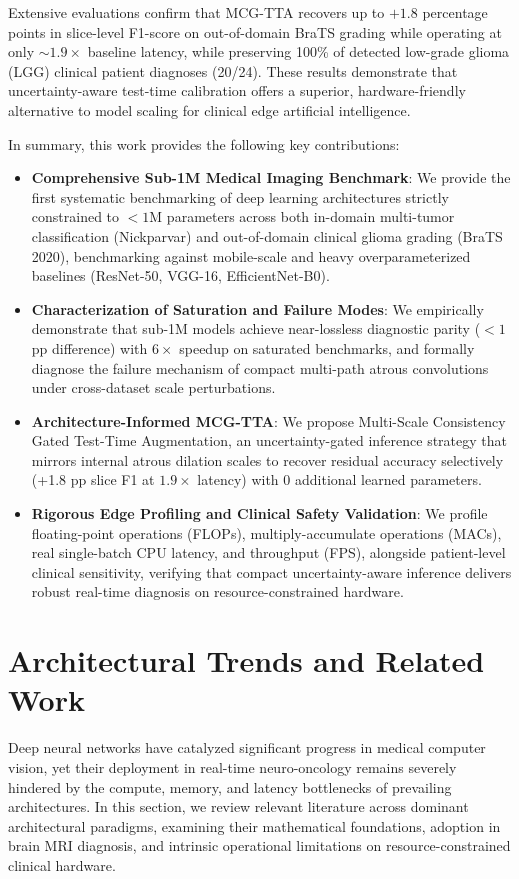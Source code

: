 ﻿\documentclass[journal]{IEEEtran}
\begin{document}
Extensive evaluations confirm that MCG-TTA recovers up to $+1.8$ percentage points in slice-level F1-score on out-of-domain BraTS grading while operating at only $\sim 1.9\times$ baseline latency, while preserving 100\% of detected low-grade glioma (LGG) clinical patient diagnoses (20/24). These results demonstrate that uncertainty-aware test-time calibration offers a superior, hardware-friendly alternative to model scaling for clinical edge artificial intelligence.

In summary, this work provides the following key contributions:
\begin{itemize}
\item \textbf{Comprehensive Sub-1M Medical Imaging Benchmark}: We provide the first systematic benchmarking of deep learning architectures strictly constrained to $<1\text{M}$ parameters across both in-domain multi-tumor classification (Nickparvar) and out-of-domain clinical glioma grading (BraTS 2020), benchmarking against mobile-scale and heavy overparameterized baselines (ResNet-50, VGG-16, EfficientNet-B0).
\item \textbf{Characterization of Saturation and Failure Modes}: We empirically demonstrate that sub-1M models achieve near-lossless diagnostic parity ($<1$ pp difference) with $6\times$ speedup on saturated benchmarks, and formally diagnose the failure mechanism of compact multi-path atrous convolutions under cross-dataset scale perturbations.
\item \textbf{Architecture-Informed MCG-TTA}: We propose Multi-Scale Consistency Gated Test-Time Augmentation, an uncertainty-gated inference strategy that mirrors internal atrous dilation scales to recover residual accuracy selectively (+1.8 pp slice F1 at $1.9\times$ latency) with 0 additional learned parameters.
\item \textbf{Rigorous Edge Profiling and Clinical Safety Validation}: We profile floating-point operations (FLOPs), multiply-accumulate operations (MACs), real single-batch CPU latency, and throughput (FPS), alongside patient-level clinical sensitivity, verifying that compact uncertainty-aware inference delivers robust real-time diagnosis on resource-constrained hardware.
\end{itemize}


\section{Architectural Trends and Related Work}

Deep neural networks have catalyzed significant progress in medical computer vision, yet their deployment in real-time neuro-oncology remains severely hindered by the compute, memory, and latency bottlenecks of prevailing architectures. In this section, we review relevant literature across dominant architectural paradigms, examining their mathematical foundations, adoption in brain MRI diagnosis, and intrinsic operational limitations on resource-constrained clinical hardware.
\end{document}
